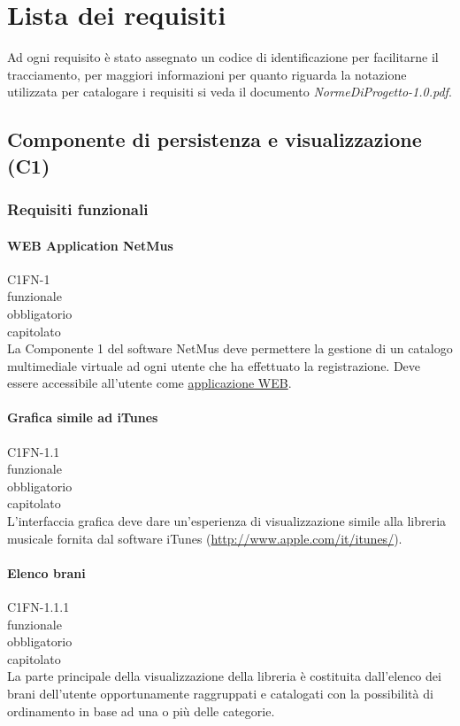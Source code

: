 \chapter{Lista dei requisiti}
\thispagestyle{fancy}
Ad ogni requisito \`e stato assegnato un codice di identificazione per facilitarne
il tracciamento, per maggiori informazioni per quanto riguarda la notazione
utilizzata per catalogare i requisiti si veda il documento
\emph{NormeDiProgetto-1.0.pdf}.

\section{Componente di persistenza e visualizzazione (C1)}
\subsection{Requisiti funzionali}

\subsubsection*{WEB Application NetMus}
 C1FN-1 \\
 funzionale \\
 obbligatorio \\
 capitolato\\
La Componente 1 del software NetMus deve permettere la gestione di un catalogo
multimediale virtuale ad ogni utente che ha effettuato la registrazione.
Deve essere accessibile all'utente come \underline{applicazione WEB}.

\subsubsection*{Grafica simile ad iTunes}
 C1FN-1.1 \\
 funzionale \\
 obbligatorio \\
 capitolato \\
L'interfaccia grafica deve dare un'esperienza di visualizzazione simile alla
libreria musicale fornita dal software iTunes (\url{http://www.apple.com/it/itunes/}).

\subsubsection*{Elenco brani}
 C1FN-1.1.1 \\
 funzionale \\
 obbligatorio \\
 capitolato \\
La parte principale della visualizzazione della libreria \`e costituita
dall'elenco dei brani dell'utente opportunamente raggruppati e catalogati con la
possibilit\`a di ordinamento in base ad una o pi\`u delle categorie.

